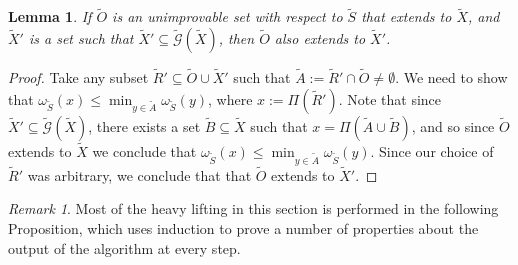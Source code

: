 \documentclass{amsbook}
\theoremstyle{plain}
\newtheorem{lemma}{Lemma}
\theoremstyle{definition}
\theoremstyle{remark}
\newtheorem{remark}{Remark}
\newcommand{\set}{\tilde}
\newcommand{\genfun}{\tilde{\mathcal{G}}}
\newcommand{\om}{\omega}
\newcommand{\paren}[1]{\left(#1\right)}
\begin{document}
\begin{lemma}
\label{lemma:recombining extension elements preserves extension}
If $\set O$ is an unimprovable set with respect to $\set S$ that extends to $\set X$, and $\set X'$ is a set such that $\set X'\subseteq\genfun(\set X)$, then $\set O$ also extends to $\set X'$.
\end{lemma}

\begin{proof}
Take any subset $\set R' \subseteq \set O\cup\set X'$ such that $\set A := \set R'\cap \set O \ne \emptyset$.  We need to show that $\om_{\set S}(x)\le\min_{y\in\set A}\om_{\set S}(y)$, where $x := \Pi(\set R')$.  Note that since $\set X'\subseteq\genfun(\set X)$, there exists a set $\set B\subseteq \set X$ such that $x = \Pi\paren{\set A\cup\set B}$, and so since $\set O$ extends to $\set X$ we conclude that $\om_{\set S}(x)\le\min_{y\in\set A}\om_{\set S}(y)$.  Since our choice of $\set R'$ was arbitrary, we conclude that that $\set O$ extends to $\set X'$.
\end{proof}
\begin{remark}
Most of the heavy lifting in this section is performed in the following Proposition, which uses induction to prove a number of properties about the output of the algorithm at every step.
\end{remark}
\end{document}

